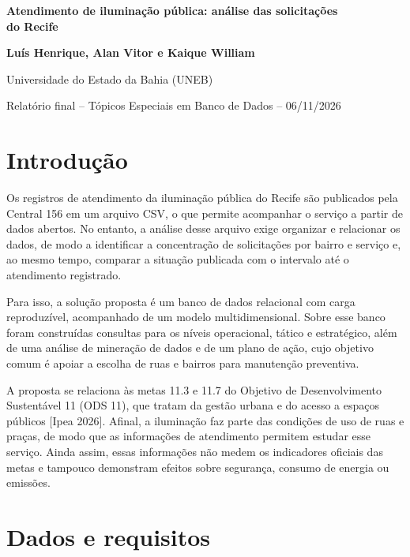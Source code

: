 \documentclass[12pt,a4paper]{article}
\begin{document}
\begin{center}
{\fontsize{16}{19}\selectfont\bfseries Atendimento de iluminação pública: análise das solicitações\\ do Recife\par}
\vspace{12pt}
{\bfseries Luís Henrique, Alan Vitor e Kaique William\par}
\vspace{6pt}
Universidade do Estado da Bahia (UNEB)\par
\vspace{6pt}
{\small Relatório final -- Tópicos Especiais em Banco de Dados -- 06/11/2026\par}
\end{center}

\section{Introdução}

Os registros de atendimento da iluminação pública do Recife são publicados pela Central 156 em um arquivo CSV, o que permite acompanhar o serviço a partir de dados abertos. No entanto, a análise desse arquivo exige organizar e relacionar os dados, de modo a identificar a concentração de solicitações por bairro e serviço e, ao mesmo tempo, comparar a situação publicada com o intervalo até o atendimento registrado.

Para isso, a solução proposta é um banco de dados relacional com carga reproduzível, acompanhado de um modelo multidimensional. Sobre esse banco foram construídas consultas para os níveis operacional, tático e estratégico, além de uma análise de mineração de dados e de um plano de ação, cujo objetivo comum é apoiar a escolha de ruas e bairros para manutenção preventiva.

A proposta se relaciona às metas 11.3 e 11.7 do Objetivo de Desenvolvimento Sustentável 11 (ODS 11), que tratam da gestão urbana e do acesso a espaços públicos [Ipea 2026]. Afinal, a iluminação faz parte das condições de uso de ruas e praças, de modo que as informações de atendimento permitem estudar esse serviço. Ainda assim, essas informações não medem os indicadores oficiais das metas e tampouco demonstram efeitos sobre segurança, consumo de energia ou emissões.

\section{Dados e requisitos}
\end{document}
